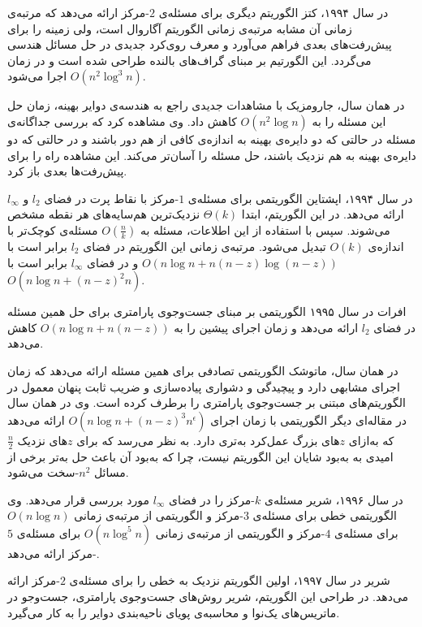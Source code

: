 در سال ۱۹۹۴، کتز  الگوریتم دیگری برای مسئله‌ی $2$-مرکز ارائه می‌دهد که مرتبه‌ی زمانی آن مشابه مرتبه‌ی زمانی الگوریتم آگاروال است، ولی زمینه را برای پیش‌رفت‌های بعدی فراهم می‌آورد و معرف روی‌کرد جدیدی در حل مسائل هندسی می‌گردد. این الگورتیم بر مبنای گراف‌های بالنده  طراحی شده است و در زمان $O(n^2 \log^3 n)$ اجرا می‌شود.

در همان سال، جارومزیک
 با مشاهدات جدیدی راجع به هندسه‌ی دوایر بهینه، زمان حل این مسئله را به $O(n^2 \log n)$ کاهش داد. وی مشاهده کرد که بررسی جداگانه‌ی مسئله در حالتی که دو دایره‌ی بهینه به اندازه‌ی کافی از هم دور باشند و در حالتی که دو دایره‌ی بهینه به هم نزدیک باشند، حل مسئله را آسان‌تر می‌کند. این مشاهده راه را برای پیش‌رفت‌ها بعدی باز کرد.

در سال ۱۹۹۴، اپشتاین  الگوریتمی برای مسئله‌ی $1$-مرکز با نقاط پرت در فضای $l_2$ و $l_\infty$ ارائه می‌دهد. در این الگوریتم، ابتدا $\Theta(k)$ نزدیک‌ترین هم‌سایه‌های هر نقطه مشخص می‌شوند. سپس با استفاده از این اطلاعات، مسئله به $O(\frac{n}{k})$ مسئله‌ی کوچک‌تر با اندازه‌ی $O(k)$ تبدیل می‌شود. مرتبه‌ی زمانی این الگوریتم در فضای $l_2$ برابر است با
$O(n \log n + n (n-z) \log (n-z))$
و در فضای $l_\infty$ برابر است با
$O(n \log n + (n-z)^2 n)$.

افرات  در سال ۱۹۹۵ الگوریتمی بر مبنای جست‌وجوی پارامتری برای حل همین مسئله در فضای $l_2$ ارائه می‌دهد و زمان اجرای پیشین را به
$O(n \log n + n(n-z))$
کاهش می‌دهد.

در همان سال، ماتوشک  الگوریتمی تصادفی برای همین مسئله ارائه می‌دهد که زمان اجرای مشابهی دارد و پیچیدگی و دشواری پیاده‌سازی و ضریب ثابت پنهان معمول در الگوریتم‌های مبتنی بر جست‌وجوی پارامتری را برطرف کرده است. وی در همان سال در مقاله‌ای دیگر  الگوریتمی با زمان اجرای
$O(n \log n + (n-z)^3 n^\epsilon)$
ارائه می‌دهد که به‌ازای $z$های بزرگ عمل‌کرد به‌تری دارد. به نظر می‌رسد که برای $z$های نزدیک $\frac{n}{2}$ امیدی به به‌بود شایان این الگوریتم نیست، چرا که به‌بود آن باعث حل به‌تر برخی از مسائل $n^2$-سخت می‌شود.

در سال ۱۹۹۶، شریر  مسئله‌ی $k$-مرکز را در فضای $l_\infty$ مورد بررسی قرار می‌دهد. وی الگوریتمی خطی برای مسئله‌ی $3$-مرکز و الگوریتمی از مرتبه‌ی زمانی $O(n \log n)$ برای مسئله‌ی $4$-مرکز و الگوریتمی از مرتبه‌ی زمانی $O(n \log^5 n)$ برای مسئله‌ی $5$-مرکز ارائه می‌دهد.

شریر  در سال ۱۹۹۷، اولین الگوریتم نزدیک به خطی را برای مسئله‌ی $2$-مرکز ارائه می‌دهد. در طراحی این الگوریتم، شریر روش‌های جست‌وجوی پارامتری، جست‌وجو در ماتریس‌های یک‌نوا  و محاسبه‌ی پویای ناحیه‌بندی دوایر را به کار می‌گیرد.

